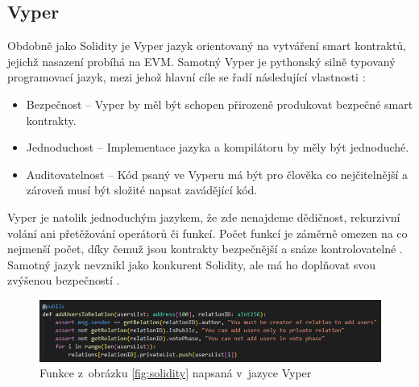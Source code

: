 \subsection*{Vyper}
Obdobně jako Solidity je Vyper jazyk orientovaný na vytváření smart kontraktů, jejichž nasazení probíhá na EVM. Samotný Vyper je pythonský silně typovaný programovací jazyk, mezi jehož hlavní cíle se řadí následující vlastnosti \cite{vyper1}: 
\begin{itemize}
\item Bezpečnost -- Vyper by měl být schopen přirozeně produkovat bezpečné smart kontrakty.
\item Jednoduchost -- Implementace jazyka a kompilátoru by měly být jednoduché.
\item Auditovatelnost -- Kód psaný ve Vyperu má být pro člověka co nejčitelnější a zároveň musí být složité napsat zavádějící kód.
\end{itemize}

Vyper je natolik jednoduchým jazykem, že zde nenajdeme dědičnost, rekurzivní volání ani přetěžování operátorů či funkcí. Počet funkcí je záměrně omezen na co nejmenší počet, díky čemuž jsou kontrakty bezpečnější a snáze kontrolovatelné \cite{vyper2}. Samotný jazyk nevznikl jako konkurent Solidity, ale má ho doplňovat svou zvýšenou bezpečností \cite{vyper3}.
\begin{figure}
\centering
\includegraphics[width=\textwidth]{obrazky/Vyper.png}
\caption{Funkce z~obrázku \ref{fig:solidity} napsaná v~jazyce Vyper}
\end{figure}

